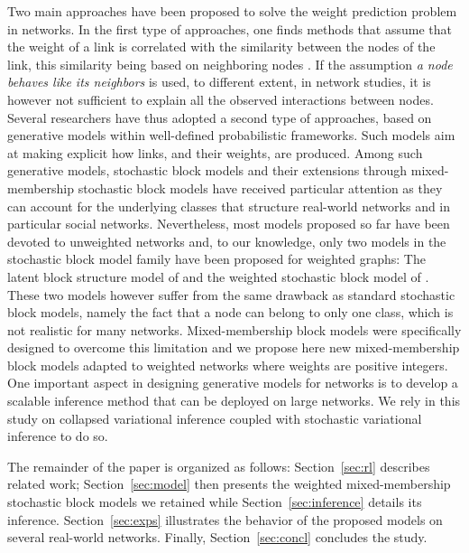 Two main approaches have been proposed to solve the weight prediction problem in networks. In the first type of approaches, one finds methods that assume that the weight of a link is correlated with the similarity between the nodes of the link, this similarity being based on neighboring nodes \cite{Zhao2015,Zhu2016}. If the assumption \textit{a node behaves like its neighbors} is used, to different extent, in network studies, it is however not sufficient to explain all the observed interactions between nodes. Several researchers have thus adopted a second type of approaches, based on generative models within well-defined probabilistic frameworks. Such models aim at making explicit how links, and their weights, are produced. Among such generative models, stochastic block models and their extensions through mixed-membership stochastic block models have received particular attention \cite{ Karrer2011,airoldi2009mixed,iMMSB,fan2015dynamic} as they can account for the underlying classes that structure real-world networks and in particular social networks. Nevertheless, most models proposed so far have been devoted to unweighted networks and, to our knowledge, only two models in the stochastic block model family have been proposed for weighted graphs: The latent block structure model of \cite{aicher2014learning} and the weighted stochastic block model of \cite{peixoto2018nonparametric}. These two models however suffer from the same drawback as standard stochastic block models, namely the fact that a node can belong to only one class, which is not realistic for many networks. Mixed-membership block models were specifically designed to overcome this limitation and we propose here new mixed-membership block models adapted to weighted networks where weights are positive integers. One important aspect in designing generative models for networks is to develop a scalable inference method that can be deployed on large networks. We rely in this study on collapsed variational inference coupled with stochastic variational inference to do so.

The remainder of the paper is organized as follows: Section~\ref{sec:rl} describes related work; Section~\ref{sec:model} then presents the weighted mixed-membership stochastic block models we retained while Section~\ref{sec:inference} details its inference. Section~\ref{sec:exps} illustrates the behavior of the proposed models on several real-world networks. Finally, Section~\ref{sec:concl} concludes the study.


